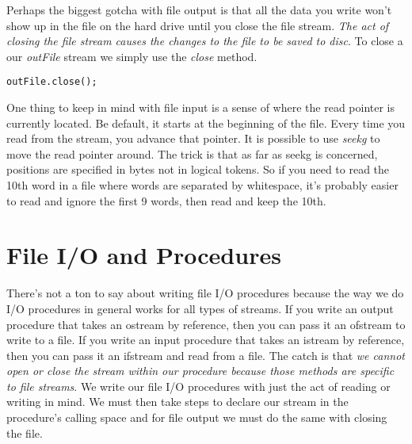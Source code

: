 \documentclass[]{tufte-handout}
\begin{document}
Perhaps the biggest gotcha with file output is that all the data you write won't show up in the file on the hard drive until you close the file stream. \textit{The act of closing the file stream causes the changes to the file to be saved to disc}.  To close a our \textit{outFile} stream we simply use the \textit{close} method.
\begin{verbatim}
outFile.close();
\end{verbatim}


One thing to keep in mind with file input is a sense of where the read pointer is currently located.  Be default, it starts at the beginning of the file.  Every time you read from the stream, you advance that pointer.  It is possible to use \textit{seekg} to move the read pointer around. The trick is that as far as seekg is concerned, positions are specified in bytes not in logical tokens.  So if you need to read the 10th word in a file where words are separated by whitespace, it's probably easier to read and ignore the first 9 words, then read and keep the 10th.

\section{File I/O and Procedures}

There's not a ton to say about writing file I/O procedures because the way we do I/O procedures in general works for all types of streams.  If you write an output procedure that takes an ostream by reference, then you can pass it an ofstream to write to a file. If you write an input procedure that takes an istream by reference, then you can pass it an ifstream and read from a file.  The catch is that \textit{we cannot open or close the stream within our procedure because those methods are specific to file streams}.  We write our file I/O procedures with just the act of reading or writing in mind. We must then take steps to declare our stream in the procedure's calling space and for file output we must do the same with closing the file.
\end{document}
